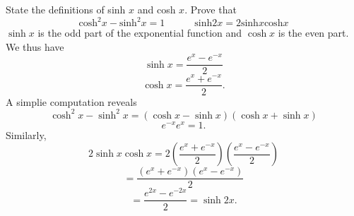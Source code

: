 State the definitions of sinh $x$ and cosh $x$. Prove that
\[
\text{cosh}^2x - \text{sinh}^2x = 1 \quad \quad \quad \text{sinh}2x = 2 \text{sinh}x\text{cosh}x
\]
\newline
$\sinh x$ is the odd part of the exponential function and $\cosh x$ is the even part. We thus have
\[
\sinh x = \frac{e^x-e^{-x}}{2}
\]
\[
\cosh x = \frac{e^x + e^{-x}}{2}.
\]
A simplie computation reveals
\[
\cosh^2x - \sinh^2x = (\cosh x - \sinh x)(\cosh x + \sinh x)
\]
\[
e^{-x}e^x = 1.
\]
Similarly,
\[
2\sinh x\cosh x = 2\left(\frac{e^x+e^{-x}}{2}\right)\left(\frac{e^x-e^{-x}}{2}\right) 
\]
\[
= \frac{(e^x+e^{-x})(e^x -e^{-x})}{2}
\]
\[
= \frac{e^{2x} -e^{-2x}}{2} = \sinh 2x.
\]